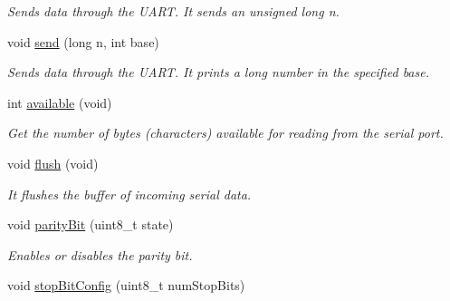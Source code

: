 \begin{DoxyCompactItemize}
\begin{DoxyCompactList}\small\item\em Sends data through the U\+A\+RT. It sends an unsigned long n. \end{DoxyCompactList}\item 
void \hyperlink{class_wasp232_a24cc0f0de0e766457b254658e9e83b03}{send} (long n, int base)\hypertarget{class_wasp232_a24cc0f0de0e766457b254658e9e83b03}{}\label{class_wasp232_a24cc0f0de0e766457b254658e9e83b03}

\begin{DoxyCompactList}\small\item\em Sends data through the U\+A\+RT. It prints a long number in the specified base. \end{DoxyCompactList}\item 
int \hyperlink{class_wasp232_ae0c0db4861a14721b9b2bc3dd2a7c5ee}{available} (void)\hypertarget{class_wasp232_ae0c0db4861a14721b9b2bc3dd2a7c5ee}{}\label{class_wasp232_ae0c0db4861a14721b9b2bc3dd2a7c5ee}

\begin{DoxyCompactList}\small\item\em Get the number of bytes (characters) available for reading from the serial port. \end{DoxyCompactList}\item 
void \hyperlink{class_wasp232_aa5596d3d17f15aa6173b245af060022e}{flush} (void)\hypertarget{class_wasp232_aa5596d3d17f15aa6173b245af060022e}{}\label{class_wasp232_aa5596d3d17f15aa6173b245af060022e}

\begin{DoxyCompactList}\small\item\em It flushes the buffer of incoming serial data. \end{DoxyCompactList}\item 
void \hyperlink{class_wasp232_af94bef74c629aa5d1beac6eba44eec4a}{parity\+Bit} (uint8\+\_\+t state)\hypertarget{class_wasp232_af94bef74c629aa5d1beac6eba44eec4a}{}\label{class_wasp232_af94bef74c629aa5d1beac6eba44eec4a}

\begin{DoxyCompactList}\small\item\em Enables or disables the parity bit. \end{DoxyCompactList}\item 
void \hyperlink{class_wasp232_ad40b0a64a165d6b60c7279dd918d4696}{stop\+Bit\+Config} (uint8\+\_\+t num\+Stop\+Bits)\hypertarget{class_wasp232_ad40b0a64a165d6b60c7279dd918d4696}{}\label{class_wasp232_ad40b0a64a165d6b60c7279dd918d4696}


\end{DoxyCompactItemize}
